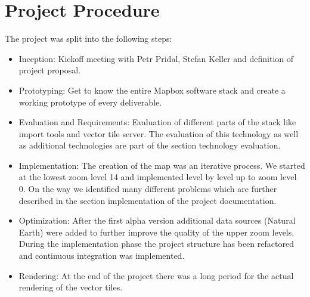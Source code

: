 \newpage
\section{Project Procedure}

The project was split into the following steps:

\begin{itemize}
\item
  Inception: Kickoff meeting with Petr Pridal, Stefan Keller and
  definition of project proposal.
\item
  Prototyping: Get to know the entire Mapbox software stack and create
  a working prototype of every deliverable.
\item
  Evaluation and Requirements: Evaluation of different parts of the
  stack like import tools and vector tile server. The evaluation of
  this technology as well as additional technologies are part of the
  section technology evaluation.
\item
  Implementation: The creation of the map was an iterative process. We
  started at the lowest zoom level 14 and implemented level by level up
  to zoom level 0. On the way we identified many different problems
  which are further described in the section implementation of the
  project documentation.
\item
  Optimization: After the first alpha version
  additional data sources (Natural Earth) were added to further improve the quality
  of the upper zoom levels. During the implementation phase the project structure
  has been refactored and continuous integration was implemented.
\item
  Rendering: At the end of the project there was a long period for the
  actual rendering of the vector tiles.
\end{itemize}
\newpage